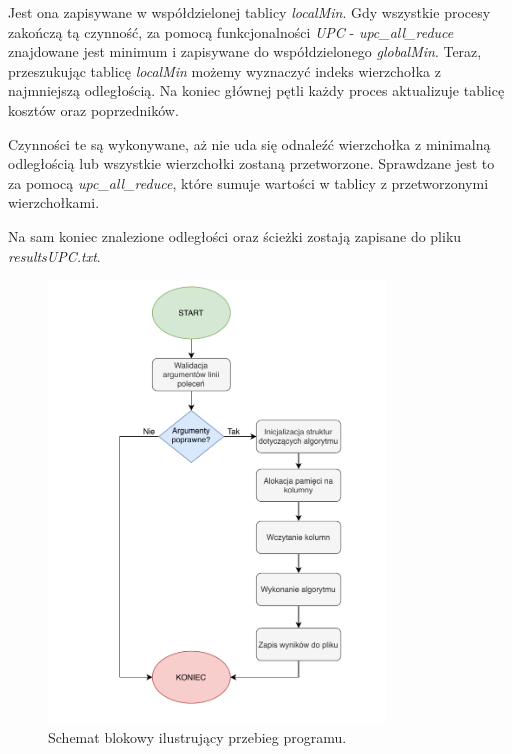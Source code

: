 \documentclass[12pt]{article}
\begin{document}
 Jest ona zapisywane w współdzielonej tablicy \textit{localMin}. Gdy wszystkie procesy zakończą tą czynność, za pomocą funkcjonalności \textit{UPC} - \textit{upc\_all\_reduce} znajdowane jest minimum i zapisywane do współdzielonego \textit{globalMin}. Teraz, przeszukując tablicę \textit{localMin} możemy wyznaczyć indeks wierzchołka z najmniejszą odległością. Na koniec głównej pętli każdy proces aktualizuje tablicę kosztów oraz poprzedników.

Czynności te są wykonywane, aż nie uda się odnaleźć wierzchołka z minimalną odległością lub wszystkie wierzchołki zostaną przetworzone. Sprawdzane jest to za pomocą \textit{upc\_all\_reduce}, które sumuje wartości w tablicy z przetworzonymi wierzchołkami.

Na sam koniec znalezione odległości oraz ścieżki zostają zapisane do pliku \textit{resultsUPC.txt}.

\begin{figure}[H]
\centering
\includegraphics[width=0.8\textwidth]{diagram1.pdf}
\caption{Schemat blokowy ilustrujący przebieg programu.}
\end{figure}
\end{document}
